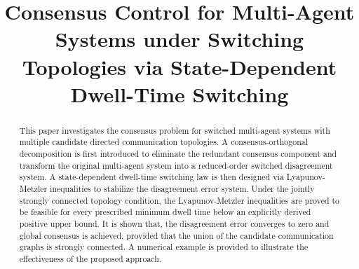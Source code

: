 \documentclass[conference]{IEEEtran}
\begin{document}
	
	\title{Consensus Control for Multi-Agent Systems under Switching Topologies via State-Dependent Dwell-Time Switching}
	
	\author{
		\and
		
		
		\and

\and
		}
	
	\maketitle
	
	\begin{abstract}
		This paper investigates the consensus problem for switched multi-agent systems with multiple candidate directed communication topologies. A consensus-orthogonal decomposition is first introduced to eliminate the redundant consensus component and transform the original multi-agent system into a reduced-order switched disagreement system. A state-dependent dwell-time switching law is then designed via Lyapunov-Metzler inequalities to stabilize the disagreement error system. Under the jointly strongly connected topology condition, the Lyapunov-Metzler inequalities are proved to be feasible for every prescribed minimum dwell time below an explicitly derived positive upper bound. It is shown that, the disagreement error converges to zero and global consensus is achieved, provided that the union of the candidate communication graphs is strongly connected. A numerical example is provided to illustrate the effectiveness of the proposed approach.
	\end{abstract}
	
\end{document}

